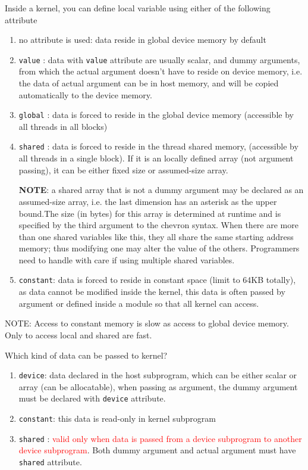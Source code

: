 Inside a kernel, you can define local variable using either of the
following attribute
\begin{enumerate}
\item no attribute is used: data reside in global device memory by
  default %
\item \verb!value! : data with \verb!value! attribute are usually
  scalar, and dummy arguments, from which the actual argument doesn't
  have to reside on device memory, i.e. the data of actual argument
  can be in host memory, and will be copied automatically to the
  device memory.

\item \verb!global! : data is forced to reside in the global device
  memory (accessible by all threads in all blocks)

\item \verb!shared! : data is forced to reside in the thread shared
  memory, (accessible by all threads in a single block). If it is an
  locally defined array (not argument passing), it can be either fixed
  size or assumed-size array.

  {\bf NOTE}: a shared array that is not a dummy argument may be
  declared as an assumed-size array, i.e. the last dimension has an
  asterisk as the upper bound.The size (in bytes) for this array is
  determined at runtime and is specified by the third argument to the
  chevron syntax. When there are more than one shared variables like
  this, they all share the same starting address memory; thus
  modifying one may alter the value of the others. Programmers need to
  handle with care if using multiple shared variables.

\item \verb!constant!: data is forced to reside in constant space
  (limit to 64KB totally), as data cannot be modified inside the
  kernel, this data is often passed by argument or defined inside a
  module so that all kernel can access.
\end{enumerate}

NOTE: Access to constant memory is slow as access to global device
memory. Only to access local and shared are fast.


Which kind of data can be passed to kernel?
\begin{enumerate}
\item \verb!device!: data declared in the host subprogram, which can
  be either scalar or array (can be allocatable), when passing as
  argument, the dummy argument must be declared with \verb!device!
  attribute. 
\item \verb!constant!: this data is read-only in kernel subprogram
\item \verb!shared! :
  \textcolor{red}{valid only when data is passed from a device
    subprogram to another device subprogram}. Both dummy argument and
  actual argument must have \verb!shared! attribute.
\end{enumerate}

